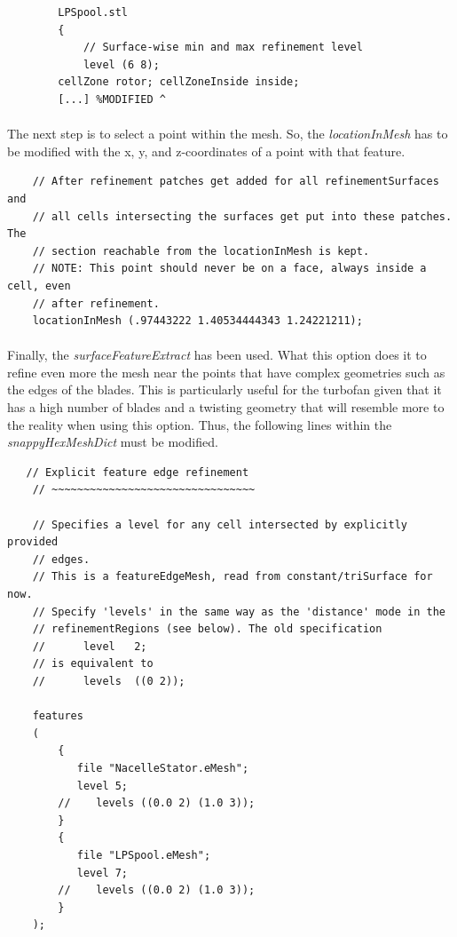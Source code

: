 \begin{footnotesize}
\begin{verbatim}
        LPSpool.stl
        {
            // Surface-wise min and max refinement level
            level (6 8);
	    cellZone rotor; cellZoneInside inside;
		[...] %MODIFIED ^
\end{verbatim}
\end{footnotesize}


\paragraph{}The next step is to select a point within the mesh. So, the \textit{locationInMesh} has to be modified with the x, y, and z-coordinates of a point with that feature.

\begin{footnotesize}
\begin{verbatim}
    // After refinement patches get added for all refinementSurfaces and
    // all cells intersecting the surfaces get put into these patches. The
    // section reachable from the locationInMesh is kept.
    // NOTE: This point should never be on a face, always inside a cell, even
    // after refinement.
    locationInMesh (.97443222 1.40534444343 1.24221211);
\end{verbatim}
\end{footnotesize}

\paragraph{}Finally, the \textit{surfaceFeatureExtract} has been used.  What this option does it to refine even more the mesh near the points that have complex geometries such as the edges of the blades. This is particularly useful for the turbofan given that it has a high number of blades and a twisting geometry that will resemble more to the reality when using this option. Thus, the following lines within the \textit{snappyHexMeshDict} must be modified.

\begin{footnotesize}
\begin{verbatim}
   // Explicit feature edge refinement
    // ~~~~~~~~~~~~~~~~~~~~~~~~~~~~~~~~

    // Specifies a level for any cell intersected by explicitly provided
    // edges.
    // This is a featureEdgeMesh, read from constant/triSurface for now.
    // Specify 'levels' in the same way as the 'distance' mode in the
    // refinementRegions (see below). The old specification
    //      level   2;
    // is equivalent to
    //      levels  ((0 2));

    features
    (
        {
           file "NacelleStator.eMesh";
           level 5;
        //    levels ((0.0 2) (1.0 3));
        }
        {
           file "LPSpool.eMesh";
           level 7;
        //    levels ((0.0 2) (1.0 3));
        }
    );
\end{verbatim}
\end{footnotesize}

